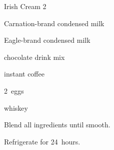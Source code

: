\begin{recipe}{Irish Cream 2}{}{}

\begin{ingredients}
\item {} Carnation-brand condensed milk
\item {} Eagle-brand condensed milk
\item \tp{1\half} chocolate drink mix
\item {} instant coffee
\item 2~eggs
\item \C{1\half} whiskey
\end{ingredients}

\begin{directions}
\item Blend all ingredients until smooth.
\item Refrigerate for 24~hours.
\end{directions}

\end{recipe}
